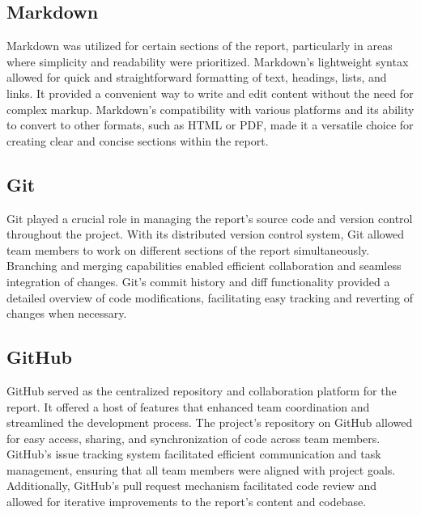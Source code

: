 \vspace{1cm}

\subsection*{Markdown}

Markdown was utilized for certain sections of the report, particularly in areas where simplicity and readability were prioritized. Markdown's lightweight syntax allowed for quick and straightforward formatting of text, headings, lists, and links. It provided a convenient way to write and edit content without the need for complex markup. Markdown's compatibility with various platforms and its ability to convert to other formats, such as HTML or PDF, made it a versatile choice for creating clear and concise sections within the report.

\vspace{1cm}

\subsection*{Git}

Git played a crucial role in managing the report's source code and version control throughout the project. With its distributed version control system, Git allowed team members to work on different sections of the report simultaneously. Branching and merging capabilities enabled efficient collaboration and seamless integration of changes. Git's commit history and diff functionality provided a detailed overview of code modifications, facilitating easy tracking and reverting of changes when necessary.

\vspace{1cm}

\subsection*{GitHub}

GitHub served as the centralized repository and collaboration platform for the report. It offered a host of features that enhanced team coordination and streamlined the development process. The project's repository on GitHub allowed for easy access, sharing, and synchronization of code across team members. GitHub's issue tracking system facilitated efficient communication and task management, ensuring that all team members were aligned with project goals. Additionally, GitHub's pull request mechanism facilitated code review and allowed for iterative improvements to the report's content and codebase.

